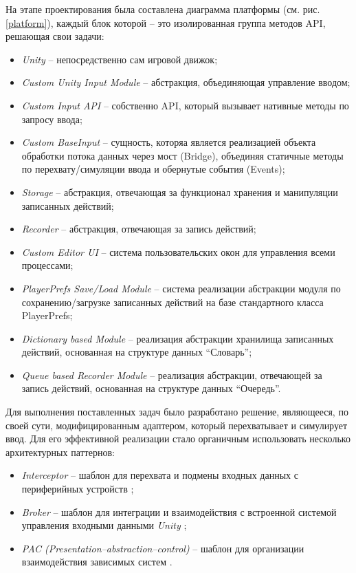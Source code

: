 На этапе проектирования была составлена диаграмма платформы (см. рис. \ref{platform}), каждый блок которой -- это изолированная группа методов API, решающая свои задачи: 
\begin{itemize}
	\item \textit{Unity} -- непосредственно сам игровой движок;
	\item \textit{Custom Unity Input Module} -- абстракция, объединяющая управление вводом;
	\item \textit{Custom Input API} -- собственно API, который вызывает нативные методы по запросу ввода;
	\item \textit{Custom BaseInput} --  сущность, которяа является реализацией объекта обработки потока данных через мост (Bridge), объединяя статичные методы по перехвату/симуляции ввода и обернутые события (Events);
	\item \textit{Storage} --  абстракция, отвечающая за функционал хранения и манипуляции записанных действий;
	\item \textit{Recorder} -- абстракция, отвечающая за запись действий;
	\item \textit{Custom Editor UI} -- система пользовательских окон для управления всеми процессами;
	\item \textit{PlayerPrefs Save/Load Module} -- система реализации абстракции модуля по сохранению/загрузке записанных действий на базе стандартного класса PlayerPrefs;
	\item \textit{Dictionary based Module} -- реализация абстракции хранилища записанных действий, основанная на структуре данных ``Словарь'';
	\item \textit{Queue based Recorder Module} -- реализация абстракции, отвечающей за запись действий, основанная на структуре данных ``Очередь''.
\end{itemize}

Для выполнения поставленных задач было разработано решение, являющееся, по своей сути, модифицированным адаптером, который перехватывает и симулирует ввод. Для его эффективной реализации стало органичным использовать несколько архитектурных паттернов:
\begin{itemize}
	\item
	\textit{Interceptor} -- шаблон для перехвата и подмены входных данных с периферийных устройств \cite{interceptor};
	\item
	\textit{Broker} -- шаблон для интеграции и взаимодействия с встроенной системой управления входными данными \textit{Unity} \cite{broker};
	\item
	\textit{PAC (Presentation–abstraction–control)} -- шаблон для организации взаимодействия зависимых систем \cite{pac}.
\end{itemize}

